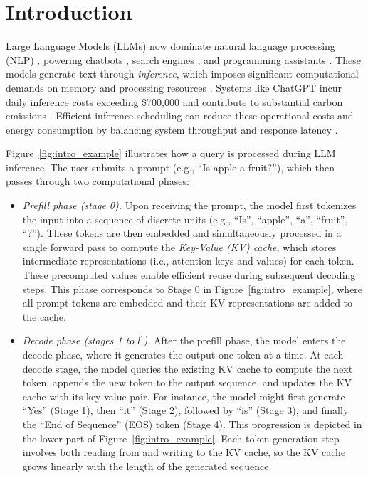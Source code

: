 \section{Introduction}

Large Language Models (LLMs) now dominate natural language processing (NLP) \citep{devlin2019bert, brown2020language, kaplan2020scaling, ouyang2022training, wei2022emergent, wei2022chain, touvron2023llama, openai2024gpt4technicalreport}, powering chatbots \citep{anthropic2023claude, bai2023qwen, openai2024gpt4technicalreport, deepseekai2025deepseekr1incentivizingreasoningcapability}, search engines \citep{google2023bard, microsoft2023bing}, and programming assistants \citep{copilot, claude_3_7}. These models generate text through \textit{inference}, which imposes significant computational demands on memory and processing resources \citep{garcia2019estimation}. Systems like ChatGPT incur daily inference costs exceeding \$700,000 and contribute to substantial carbon emissions \citep{patel2023peeling, patterson2021carbon}. Efficient inference scheduling can reduce these operational costs and energy consumption \citep{strubell2019energy, desislavov2021compute} by balancing system throughput and response latency \citep{wu2022sustainable}.

Figure~\ref{fig:intro_example} illustrates how a query is processed during LLM inference. The user submits a prompt (e.g., ``Is apple a fruit?''), which then passes through two computational phases:
\begin{itemize}
    \item \emph{Prefill phase (stage 0).} Upon receiving the prompt, the model first tokenizes the input into a sequence of discrete units (e.g., ``Is'', ``apple'', ``a'', ``fruit'', ``?''). These tokens are then embedded and simultaneously processed in a single forward pass to compute the \emph{Key-Value (KV) cache}, which stores intermediate representations (i.e., attention keys and values) for each token. These precomputed values enable efficient reuse during subsequent decoding steps. This phase corresponds to Stage 0 in Figure~\ref{fig:intro_example}, where all prompt tokens are embedded and their KV representations are added to the cache.

    \item \emph{Decode phase (stages 1 to $l^\prime$).} After the prefill phase, the model enters the decode phase, where it generates the output one token at a time. At each decode stage, the model queries the existing KV cache to compute the next token, appends the new token to the output sequence, and updates the KV cache with its key-value pair. For instance, the model might first generate ``Yes'' (Stage 1), then ``it'' (Stage 2), followed by ``is'' (Stage 3), and finally the ``End of Sequence'' (EOS) token (Stage 4). This progression is depicted in the lower part of Figure~\ref{fig:intro_example}. Each token generation step involves both reading from and writing to the KV cache, so the KV cache grows linearly with the length of the generated sequence.
\end{itemize}

